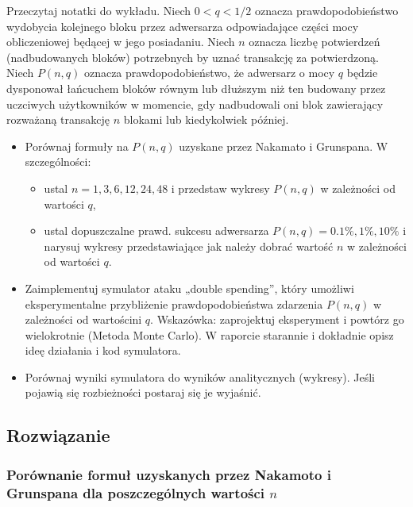 \documentclass{article}
\begin{document}
    Przeczytaj notatki do wykładu. Niech $0 < q < 1/2$ oznacza prawdopodobieństwo wydobycia kolejnego bloku przez adwersarza odpowiadające części
    mocy obliczeniowej będącej w jego posiadaniu. Niech $n$ oznacza liczbę potwierdzeń (nadbudowanych bloków) potrzebnych by uznać transakcję za 
    potwierdzoną. Niech $P(n,q)$ oznacza prawdopodobieństwo, że adwersarz o mocy $q$ będzie dysponował łańcuchem bloków równym lub dłuższym niż 
    ten budowany przez uczciwych użytkowników w momencie, gdy nadbudowali oni blok zawierający rozważaną transakcję $n$ blokami lub kiedykolwiek 
    później.
    \begin{itemize}
        \item Porównaj formuły na $P(n,q)$ uzyskane przez Nakamato i Grunspana. W szczególności:
        \begin{itemize}
            \item ustal $n= 1,3,6,12,24,48$ i przedstaw wykresy $P(n,q)$ w zależności od wartości $q$,
            \item ustal dopuszczalne prawd. sukcesu adwersarza $P(n,q) = 0.1\%,1\%,10\%$ i narysuj wykresy przedstawiające jak należy dobrać 
                wartość $n$ w zależności od wartości $q$.
        \end{itemize}
        \item Zaimplementuj symulator ataku „double spending”, który umożliwi eksperymentalne przybliżenie prawdopodobieństwa zdarzenia $P(n,q)$ 
            w zależności od wartościni $q$. Wskazówka: zaprojektuj eksperyment i powtórz go wielokrotnie (Metoda Monte Carlo). W raporcie starannie
            i dokładnie opisz ideę działania i kod symulatora.
        \item Porównaj wyniki symulatora do wyników analitycznych (wykresy). Jeśli pojawią się rozbieżności postaraj się je wyjaśnić.
    \end{itemize}
    
    \subsection{Rozwiązanie}

    \subsubsection{Porównanie formuł uzyskanych przez Nakamoto i Grunspana dla poszczególnych wartości $n$}
\end{document}
